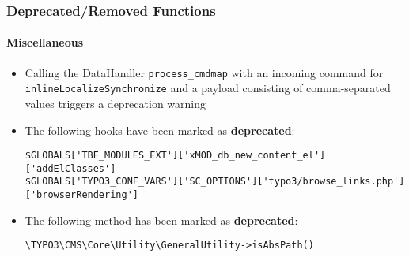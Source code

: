%

\begin{frame}[fragile]
	\frametitle{Deprecated/Removed Functions}
	\framesubtitle{Miscellaneous}


	\begin{itemize}
		\item Calling the DataHandler \texttt{process\_cmdmap} with an incoming
			command for \texttt{inlineLocalizeSynchronize} and a payload
			consisting of comma-separated values triggers a deprecation warning

		\item The following hooks have been marked as \textbf{deprecated}:
\begin{lstlisting}
$GLOBALS['TBE_MODULES_EXT']['xMOD_db_new_content_el']['addElClasses']
$GLOBALS['TYPO3_CONF_VARS']['SC_OPTIONS']['typo3/browse_links.php']['browserRendering']
\end{lstlisting}

		\item The following method has been marked as \textbf{deprecated}:
\begin{lstlisting}
\TYPO3\CMS\Core\Utility\GeneralUtility->isAbsPath()
\end{lstlisting}

	\end{itemize}

\end{frame}

